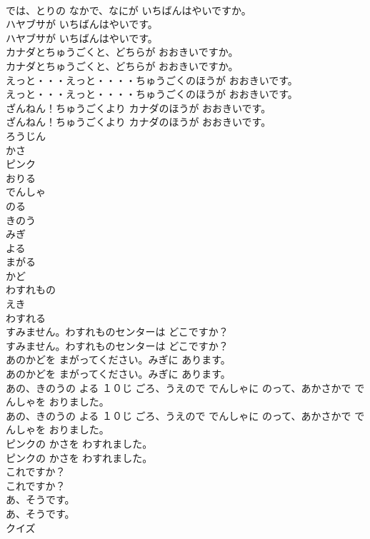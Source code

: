 \documentclass[8pt]{extreport}
\begin{document}
\begin{CJK}{UTF8}{min}
\\	では、とりの なかで、なにが いちばんはやいですか。 
\\	ハヤブサが いちばんはやいです。	
\\	ハヤブサが いちばんはやいです。 
\\	カナダとちゅうごくと、どちらが おおきいですか。	
\\	カナダとちゅうごくと、どちらが おおきいですか。 
\\	えっと・・・えっと・・・・ちゅうごくのほうが おおきいです。	
\\	えっと・・・えっと・・・・ちゅうごくのほうが おおきいです。 
\\	ざんねん！ちゅうごくより カナダのほうが おおきいです。	
\\	ざんねん！ちゅうごくより カナダのほうが おおきいです。 
\\	ろうじん
\\	かさ
\\	ピンク
\\	おりる
\\	でんしゃ
\\	のる
\\	きのう
\\	みぎ
\\	よる
\\	まがる
\\	かど
\\	わすれもの
\\	えき
\\	わすれる
\\	すみません。わすれものセンターは どこですか？	
\\	すみません。わすれものセンターは どこですか？ 
\\	あのかどを まがってください。みぎに あります。	
\\	あのかどを まがってください。みぎに あります。 
\\	あの、きのうの よる １０じ ごろ、うえので でんしゃに のって、あかさかで でんしゃを おりました。	
\\	あの、きのうの よる １０じ ごろ、うえので でんしゃに のって、あかさかで でんしゃを おりました。 
\\	ピンクの かさを わすれました。	
\\	ピンクの かさを わすれました。 
\\	これですか？	
\\	これですか？ 
\\	あ、そうです。	
\\	あ、そうです。 
\\	クイズ

\end{CJK}
\end{document}
